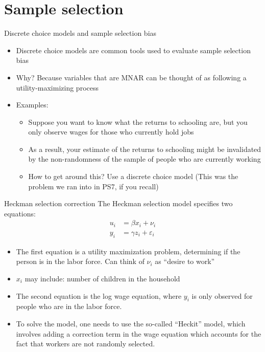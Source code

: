 \documentclass[english,aspectratio=169,12pt,xcolor=dvipsnames]{beamer}
\begin{document}
\section{Sample selection}
\begin{frame}[fragile]{Discrete choice models and sample selection bias}
\begin{itemize}
\item Discrete choice models are common tools used to evaluate sample selection bias
\item Why? Because variables that are MNAR can be thought of as following a utility-maximizing process
\item Examples:
    \begin{itemize}
    \item Suppose you want to know what the returns to schooling are, but you only observe wages for those who currently hold jobs
    \item As a result, your estimate of the returns to schooling might be invalidated by the non-randomness of the sample of people who are currently working
    \item How to get around this? Use a discrete choice model (This was the problem we ran into in PS7, if you recall)
    \end{itemize}
\end{itemize}
\end{frame}


\begin{frame}{Heckman selection correction}
The Heckman selection model specifies two equations:
\begin{align*}
    u_{i}&= \beta x_{i} + \nu_{i} \\
    y_{i} &= \gamma z_{i} + \varepsilon_{i}
\end{align*}
\begin{itemize}
    \item The first equation is a utility maximization problem, determining if the person is in the labor force. Can think of $\nu_{i}$ as ``desire to work''
    \item $x_{i}$ may include: number of children in the household
    \item The second equation is the log wage equation, where $y_i$ is only observed for people who are in the labor force.
    \item To solve the model, one needs to use the so-called ``Heckit'' model, which involves adding a correction term in the wage equation which accounts for the fact that workers are not randomly selected.
\end{itemize}
\end{frame}
\end{document}
